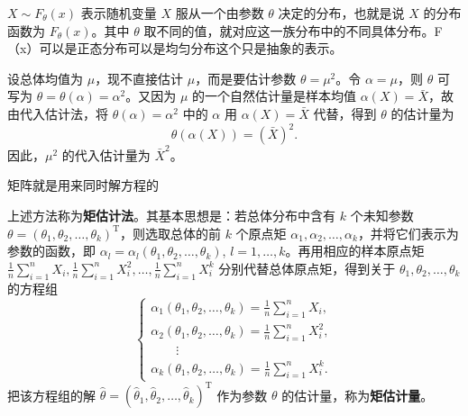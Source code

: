 \begin{note}
\(X\sim F_\theta(x)\) 表示随机变量 \(X\) 服从一个由参数 \(\theta\) 决定的分布，也就是说 \(X\) 的分布函数为 \(F_\theta(x)\)。其中 \(\theta\) 取不同的值，就对应这一族分布中的不同具体分布。F（x）可以是正态分布可以是均匀分布这个只是抽象的表示。
\end{note}
\begin{example}
设总体均值为 \(\mu\)，现不直接估计 \(\mu\)，而是要估计参数
\(\theta=\mu^2\)。令 \(\alpha=\mu\)，则 \(\theta\) 可写为
\(\theta=\theta(\alpha)=\alpha^2\)。又因为 \(\mu\) 的一个自然估计量是样本均值
\(\alpha(X)=\bar X\)，故由代入估计法，将 \(\theta(\alpha)=\alpha^2\) 中的 \(\alpha\) 用 \(\alpha(X)=\bar X\) 代替，得到 \(\theta\) 的估计量为
\[
\theta(\alpha(X))=(\bar X)^2.
\]
因此，\(\mu^2\) 的代入估计量为 \(\bar X^2\)。
\end{example}
\begin{dxtips}
    矩阵就是用来同时解方程的
\end{dxtips}
\begin{note}
上述方法称为\textbf{矩估计法}。其基本思想是：若总体分布中含有 \(k\) 个未知参数
\(\theta=(\theta_1,\theta_2,\dots,\theta_k)^{\mathrm T}\)，则选取总体的前 \(k\) 个原点矩
\(\alpha_1,\alpha_2,\dots,\alpha_k\)，并将它们表示为参数的函数，即
\(\alpha_l=\alpha_l(\theta_1,\theta_2,\dots,\theta_k)\), \(l=1,\dots,k\)。再用相应的样本原点矩
\(\frac{1}{n}\sum_{i=1}^n X_i,\frac{1}{n}\sum_{i=1}^n X_i^2,\dots,\frac{1}{n}\sum_{i=1}^n X_i^k\)
分别代替总体原点矩，得到关于 \(\theta_1,\theta_2,\dots,\theta_k\) 的方程组
\[
\begin{cases}
\alpha_1(\theta_1,\theta_2,\dots,\theta_k)=\frac{1}{n}\sum_{i=1}^n X_i,\\
\alpha_2(\theta_1,\theta_2,\dots,\theta_k)=\frac{1}{n}\sum_{i=1}^n X_i^2,\\
\qquad\vdots\\
\alpha_k(\theta_1,\theta_2,\dots,\theta_k)=\frac{1}{n}\sum_{i=1}^n X_i^k.
\end{cases}
\]
把该方程组的解 \(\hat\theta=(\hat\theta_1,\hat\theta_2,\dots,\hat\theta_k)^{\mathrm T}\) 作为参数 \(\theta\) 的估计量，称为\textbf{矩估计量}。
\end{note}

